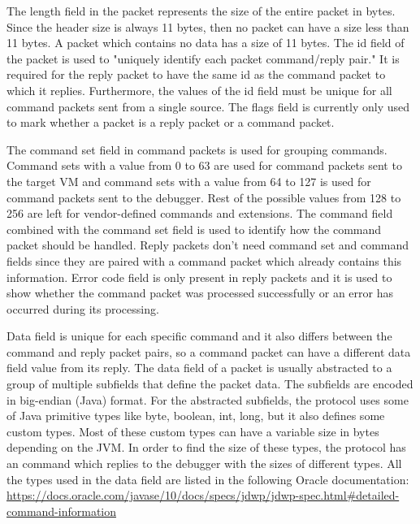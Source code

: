 \documentclass[..thesis.tex]{subfiles}
\begin{document}
The length field in the packet represents the size of the entire packet in bytes. 
Since the header size is always 11 bytes, then no packet can have a size less than 11 bytes.
A packet which contains no data has a size of 11 bytes.
The id field of the packet is used to "uniquely identify each packet command/reply pair."\cite{oracle_jdwp_spec}
It is required for the reply packet to have the same id as the command packet to which it replies.
Furthermore, the values of the id field must be unique for all command packets sent from a single source.
The flags field is currently only used to mark whether a packet is a reply packet or a command packet.

The command set field in command packets is used for grouping commands. 
Command sets with a value from 0 to 63 are used for command packets sent to the target VM and command sets with a value from 64 to 127 is used for command packets sent to the debugger. Rest of the possible values from 128 to 256 are left for vendor-defined commands and extensions.\cite{oracle_jdwp_spec}
The command field combined with the command set field is used to identify how the command packet should be handled. 
Reply packets don't need command set and command fields since they are paired with a command packet which already contains this information.
Error code field is only present in reply packets and it is used to show whether the command packet was processed successfully or an error has occurred during its processing.

Data field is unique for each specific command and it also differs between the command and reply packet pairs, so a command packet can have a different data field value from its reply.
The data field of a packet is usually abstracted to a group of multiple subfields that define the packet data. The subfields are encoded in big-endian (Java) format.
For the abstracted subfields, the protocol uses some of Java primitive types like byte, boolean, int, long, but it also defines some custom types.
Most of these custom types can have a variable size in bytes depending on the JVM.
In order to find the size of these types, the protocol has an  command which replies to the debugger with the sizes of different types.\cite{oracle_jdwp_spec}
All the types used in the data field are listed in the following Oracle documentation: \url{https://docs.oracle.com/javase/10/docs/specs/jdwp/jdwp-spec.html\#detailed-command-information}
\end{document}
